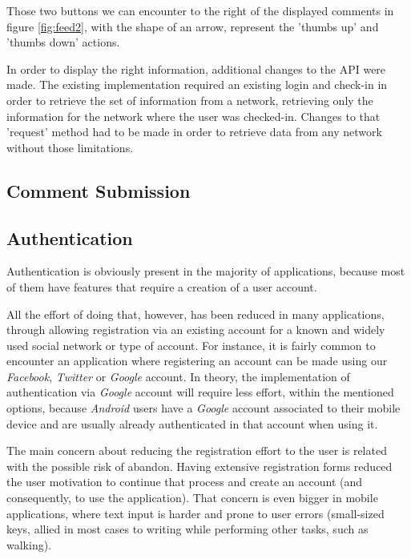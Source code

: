 Those two buttons we can encounter to the right of the displayed comments in figure \ref{fig:feed2}, with the shape of an arrow, represent the 'thumbs up' and 'thumbs down' actions.

In order to display the right information, additional changes to the API were made. The existing implementation required an existing login and check-in in order to retrieve the set of information from a network, retrieving only the information for the network where the user was checked-in. Changes to that 'request' method had to be made in order to retrieve data from any network without those limitations.

\newpage

\subsection{Comment Submission}\label{comment}

\subsection{Authentication}\label{authentication}

Authentication is obviously present in the majority of applications, because most of them have features that require a creation of a user account.

All the effort of doing that, however, has been reduced in many applications, through allowing registration via an existing account for a known and widely used social network or type of account. For instance, it is fairly common to encounter an application where registering an account can be made using our \emph{Facebook}, \emph{Twitter} or \emph{Google} account. In theory, the implementation of authentication via \emph{Google} account will require less effort, within the mentioned options, because \emph{Android} users have a \emph{Google} account associated to their mobile device and are usually already authenticated in that account when using it.

The main concern about reducing the registration effort to the user is related with the possible risk of abandon. Having extensive registration forms reduced the user motivation to continue that process and create an account (and consequently, to use the application). That concern is even bigger in mobile applications, where text input is harder and prone to user errors (small-sized keys, allied in most cases to writing while performing other tasks, such as walking).

